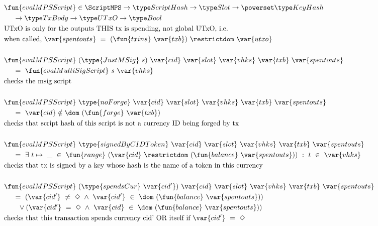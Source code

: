 \begin{figure*}[htb]
  \begin{align*}
    & \fun{evalMPSScript} \in\ScriptMPS\to\ScriptHash\to\Slot\to\powerset\KeyHash \\
    &~~~~\to\TxBody\to\UTxO \to\Bool  \\
    & \text{UTxO is only for the outputs THIS tx is spending, not global UTxO, i.e.} \\
    & \text{when called,}~\var{spentouts}~=~(\fun{txins}~\var{txb}) ~\restrictdom~\var{utxo} \\~\\
    & \fun{evalMPSScript}  ~(\type{JustMSig}~s)~\var{cid}~\var{slot}~\var{vhks}
     ~\var{txb}~\var{spentouts} \\
    &~~~~ =~ \fun{evalMultiSigScript}~s~\var{vhks} \\
    & \text {checks the msig script}\\~\\
    & \fun{evalMPSScript}
     ~\type{noForge}~\var{cid}~ \var{slot}~\var{vhks} ~\var{txb}~\var{spentouts} \\
    &~~~~ =~ \var{cid} \notin \dom~(\fun{forge}~\var{txb}) \\
    & \text {checks that script hash of this script is not a currency ID being forged by tx}  \\~\\
    & \fun{evalMPSScript}
     ~\type{signedByCIDToken}~\var{cid}~ \var{slot}~\var{vhks} ~\var{txb}~\var{spentouts} \\
    &~~~~ =~ \exists~t\mapsto ~\_~\in~ \fun{range}~(\var{cid}~ \restrictdom~(\fun{balance}~\var{spentouts})) ~:~ t~\in~\var{vhks} \\
    & \text{checks that tx is signed by a key whose hash is the name of a token in this currency}
    \\~\\
    & \fun{evalMPSScript}
     ~(\type{spendsCur}~\var{cid'})~\var{cid}~ \var{slot}~\var{vhks} ~\var{txb}~\var{spentouts} \\
    &~~~~ =~ (\var{cid'}~\neq~\Nothing ~\wedge ~\var{cid'}~\in~ \dom~(\fun{balance}~\var{spentouts}))\\
    &~~~~~~ \vee (\var{cid'}~=~\Nothing ~\wedge ~\var{cid}~\in~ \dom~(\fun{balance}~\var{spentouts})) \\
    & \text{checks that this transaction spends currency cid' OR itself if}~\var{cid'}~=~\Nothing
    \\~\\

\end{align*}
\end{figure*}
